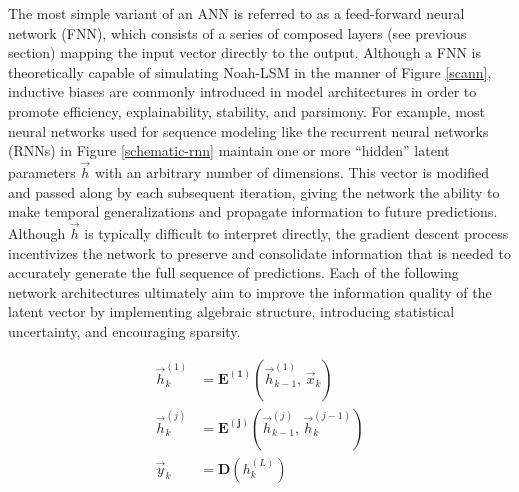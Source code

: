 The most simple variant of an ANN is referred to as a feed-forward neural network (FNN), which consists of a series of composed layers (see previous section) mapping the input vector directly to the output. Although a FNN is theoretically capable of simulating Noah-LSM in the manner of Figure \ref{scann}, inductive biases are commonly introduced in model architectures in order to promote efficiency, explainability, stability, and parsimony. For example, most neural networks used for sequence modeling like the recurrent neural networks (RNNs) in Figure \ref{schematic-rnn} maintain one or more ``hidden'' latent parameters $\vec{h}$ with an arbitrary number of dimensions. This vector is modified and passed along by each subsequent iteration, giving the network the ability to make temporal generalizations and propagate information to future predictions. Although $\vec{h}$ is typically difficult to interpret directly, the gradient descent process incentivizes the network to preserve and consolidate information that is needed to accurately generate the full sequence of predictions. Each of the following network architectures ultimately aim to improve the information quality of the latent vector by implementing algebraic structure, introducing statistical uncertainty, and encouraging sparsity.

\begin{equation}\label{eq_rnn}
    \begin{split}
        \vec{h}_k^{(1)} &= \mathbf{E^{(1)}}\left(\vec{h}_{k-1}^{(1)},\, \vec{x}_k\right) \\
        \vec{h}_k^{(j)} &= \mathbf{E^{(j)}}\left(\vec{h}_{k-1}^{(j)},\, \vec{h}_k^{(j-1)}\right) \\
        \vec{y}_k &= \mathbf{D}\left(h_k^{(L)}\right)
    \end{split}
\end{equation}

